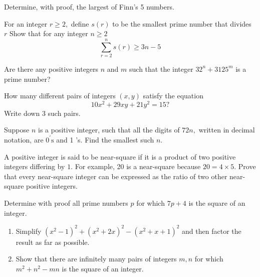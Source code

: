 \documentclass{pset}
\begin{document}
\begin{problems}
\begin{problem}
    Determine, with proof, the largest of Finn's 5 numbers.
    \end{problem}

    \begin{problem}
    For an integer \(r \geq 2,\) define \(s(r)\) to be the smallest prime number that divides \(r\) Show that for any integer \(n \geq 2\)
    $$
        \sum_{r=2}^{n} s(r) \geq 3 n-5
    $$
    \end{problem}

    \begin{problem}
    Are there any positive integers \(n\) and \(m\) such that the integer \(32^{n}+3125^{m}\) is a prime number?
    \end{problem}

    \begin{problem}
    How many different pairs of integers \((x, y)\) satisfy the equation
    $$
        10 x^{2}+29 x y+21 y^{2}=15 ?
    $$
    Write down 3 such pairs.
    \end{problem}

    \begin{problem}
    Suppose \(n\) is a positive integer, such that all the digits of \(72 n,\) written in decimal notation, are \(0^{\prime} \mathrm{s}\) and 1 's. Find the smallest such \(n .\)
    \end{problem}

    \begin{problem}
    A positive integer is said to be near-square if it is a product of two positive integers differing by \(1 .\) For example, 20 is a near-square because \(20=4 \times 5 .\) Prove that every near-square integer can be expressed as the ratio of two other near-square positive integers.
    \end{problem}

    \begin{problem}
    Determine with proof all prime numbers \(p\) for which \(7 p+4\) is the square of an integer.
    \end{problem}

    \begin{problem}
    \begin{enumerate}
        \item Simplify \(\left(x^{2}-1\right)^{2}+\left(x^{2}+2 x\right)^{2}-\left(x^{2}+x+1\right)^{2}\) and then factor the result as far as possible.
        \item Show that there are infinitely many pairs of integers \(m, n\) for which \(m^{2}+n^{2}-m n\) is the square of an integer.


\end{enumerate}
\end{problem}
\end{problems}
\end{document}
